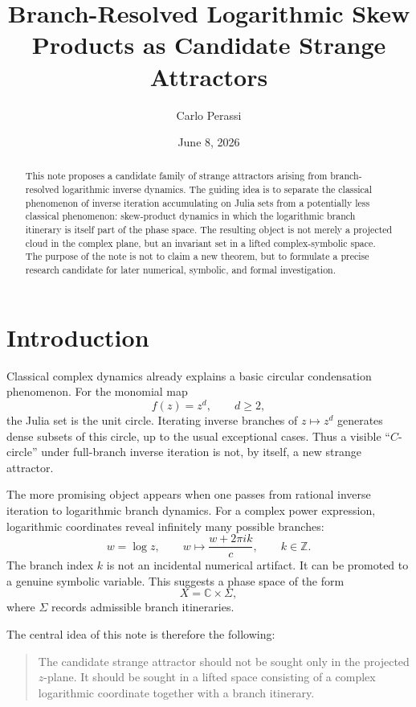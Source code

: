 \documentclass[12pt]{article}
\title{Branch-Resolved Logarithmic Skew Products as Candidate Strange Attractors}
\author{Carlo Perassi}
\date{June 8, 2026}
\newcommand{\C}{\mathbb{C}}
\newcommand{\Z}{\mathbb{Z}}
\begin{document}
	
	\maketitle
	
	\begin{abstract}
		This note proposes a candidate family of strange attractors arising from branch-resolved logarithmic inverse dynamics. The guiding idea is to separate the classical phenomenon of inverse iteration accumulating on Julia sets from a potentially less classical phenomenon: skew-product dynamics in which the logarithmic branch itinerary is itself part of the phase space. The resulting object is not merely a projected cloud in the complex plane, but an invariant set in a lifted complex-symbolic space. The purpose of the note is not to claim a new theorem, but to formulate a precise research candidate for later numerical, symbolic, and formal investigation.
	\end{abstract}
	
	\section{Introduction}
	
	Classical complex dynamics already explains a basic circular condensation phenomenon. For the monomial map
	\[
	f(z)=z^d,
	\qquad d\geq 2,
	\]
	the Julia set is the unit circle. Iterating inverse branches of \(z\mapsto z^d\) generates dense subsets of this circle, up to the usual exceptional cases. Thus a visible ``\(C\)-circle'' under full-branch inverse iteration is not, by itself, a new strange attractor.
	
	The more promising object appears when one passes from rational inverse iteration to logarithmic branch dynamics. For a complex power expression, logarithmic coordinates reveal infinitely many possible branches:
	\[
	w=\log z,
	\qquad
	w \mapsto \frac{w+2\pi i k}{c},
	\qquad k\in \Z.
	\]
	The branch index \(k\) is not an incidental numerical artifact. It can be promoted to a genuine symbolic variable. This suggests a phase space of the form
	\[
	X = \C \times \Sigma,
	\]
	where \(\Sigma\) records admissible branch itineraries.
	
	The central idea of this note is therefore the following:
	
	\begin{quote}
		The candidate strange attractor should not be sought only in the projected \(z\)-plane. It should be sought in a lifted space consisting of a complex logarithmic coordinate together with a branch itinerary.
	\end{quote}
	
\end{document}
